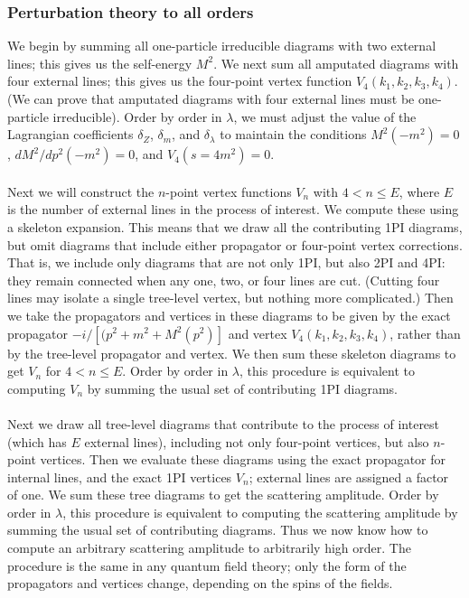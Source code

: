 \subsubsection{Perturbation theory to all orders}
We begin by summing all one-particle irreducible diagrams with two external lines; this gives us the self-energy $M^2$. We next sum all amputated diagrams with four external lines; this gives us the four-point vertex function $V_4(k_1, k_2, k_3, k_4)$. (We can prove that amputated diagrams with four external lines must be one-particle irreducible). Order by order in $\lambda$, we must adjust the value of the Lagrangian coefficients $\delta_Z$, $\delta_m$, and $\delta_{\lambda}$ to maintain the conditions $M^2(-m^2) = 0$, ${dM^2}/{dp^2}(-m^2) = 0$, and $V_4(s=4m^2) =0$. 
\\ \\
Next we will construct the $n$-point vertex functions $V_n$ with $4 < n \leq E$, where $E$ is the number of external lines in the process of interest. We compute these using a skeleton expansion. This means that we draw all the contributing 1PI diagrams, but omit diagrams that include either propagator or four-point vertex corrections. That is, we include only diagrams that are not only 1PI, but also 2PI and 4PI: they remain connected when any one, two, or four lines are cut. (Cutting four lines may isolate a single tree-level vertex, but nothing more complicated.) Then we take the propagators and vertices in these diagrams to be given by the exact propagator $-i / [(p^2+m^2+M^2(p^2)]$ and vertex $V_4(k_1,k_2,k_3,k_4)$, rather than by the tree-level propagator and vertex. We then sum these skeleton diagrams to get $V_n$ for $4 < n \leq E$. Order by order in $\lambda$, this procedure is
equivalent to computing $V_n$ by summing the usual set of contributing 1PI diagrams.
\\ \\
Next we draw all tree-level diagrams that contribute to the process of interest (which has $E$ external lines), including not only four-point vertices, but also $n$-point vertices. Then we evaluate these diagrams using the exact propagator for internal lines, and the exact 1PI vertices $V_n$; external lines are assigned a factor of one. We sum these tree diagrams to get the scattering amplitude. Order by order in $\lambda$, this procedure is equivalent to computing the scattering amplitude by summing the usual set of contributing diagrams.
Thus we now know how to compute an arbitrary scattering amplitude
to arbitrarily high order. The procedure is the same in any quantum field theory; only the form of the propagators and vertices change, depending on the spins of the fields.


